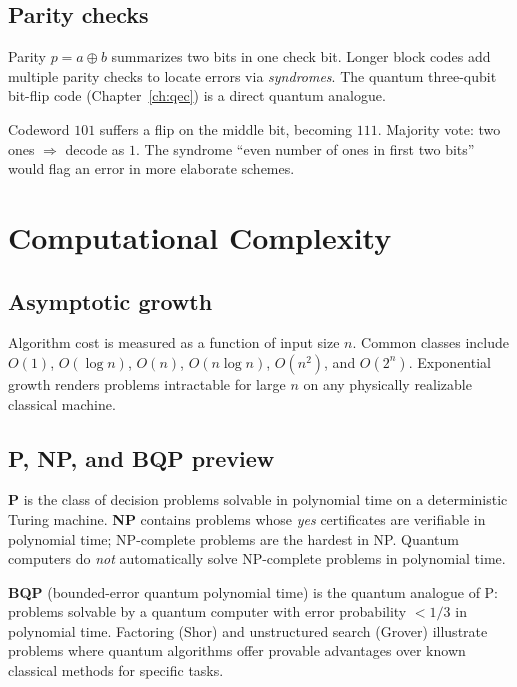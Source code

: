 \subsection{Parity checks}

Parity $p=a\oplus b$ summarizes two bits in one check bit. Longer block codes add multiple parity checks to locate errors via \emph{syndromes}. The quantum three-qubit bit-flip code (Chapter~\ref{ch:qec}) is a direct quantum analogue.

\begin{example}
Codeword $101$ suffers a flip on the middle bit, becoming $111$. Majority vote: two ones $\Rightarrow$ decode as $1$. The syndrome ``even number of ones in first two bits'' would flag an error in more elaborate schemes.
\end{example}

\section{Computational Complexity}
\label{sec:complexity}

\subsection{Asymptotic growth}

Algorithm cost is measured as a function of input size $n$. Common classes include $O(1)$, $O(\log n)$, $O(n)$, $O(n\log n)$, $O(n^2)$, and $O(2^n)$. Exponential growth renders problems intractable for large $n$ on any physically realizable classical machine.

\subsection{P, NP, and BQP preview}

\textbf{P} is the class of decision problems solvable in polynomial time on a deterministic Turing machine. \textbf{NP} contains problems whose \emph{yes} certificates are verifiable in polynomial time; NP-complete problems are the hardest in NP. Quantum computers do \emph{not} automatically solve NP-complete problems in polynomial time.

\textbf{BQP} (bounded-error quantum polynomial time) is the quantum analogue of P: problems solvable by a quantum computer with error probability $<1/3$ in polynomial time. Factoring (Shor) and unstructured search (Grover) illustrate problems where quantum algorithms offer provable advantages over known classical methods for specific tasks.

